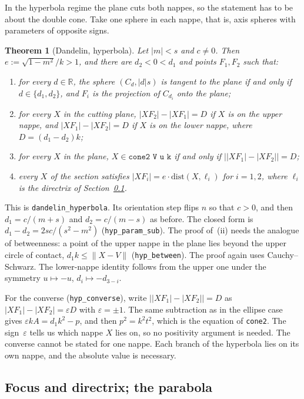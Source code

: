 \documentclass[11pt]{article}
\newtheorem{theorem}{Theorem}
\theoremstyle{remark}
\newcommand{\lean}[1]{\texttt{#1}}
\newcommand{\nm}[1]{\lVert #1\rVert}
\newcommand{\R}{\mathbb{R}}
\begin{document}
In the hyperbola regime the plane cuts both nappes, so the statement has to be about the double
cone. Take one sphere in each nappe, that is, axis spheres with parameters of opposite signs.

\begin{theorem}[Dandelin, hyperbola]\label{thm:hyperbola}
Let $|m|<s$ and $c\neq0$. Then $e:=\sqrt{1-m^2}/k>1$, and there are $d_2<0<d_1$ and points
$F_1,F_2$ such that:
\begin{enumerate}
\item[(i)] for every $d\in\R$, the sphere $(C_d,|d|s)$ is tangent to the plane if and only if $d\in\{d_1,d_2\}$, and
$F_i$ is the projection of $C_{d_i}$ onto the plane;
\item[(ii)] for every $X$ in the cutting plane, $|XF_2|-|XF_1|=D$ if $X$ is on the upper nappe, and
$|XF_1|-|XF_2|=D$ if $X$ is on the lower nappe, where $D=(d_1-d_2)k$;
\item[(iii)] for every $X$ in the plane, $X\in\lean{cone2 V u k}$ if and only if $\bigl||XF_1|-|XF_2|\bigr|=D$;
\item[(iv)] every $X$ of the section satisfies $|XF_i|=e\cdot\mathrm{dist}(X,\ell_i)$ for
$i=1,2$, where $\ell_i$ is the directrix of Section~\ref{sec:directrix}.
\end{enumerate}
\end{theorem}

This is \lean{dandelin\_hyperbola}. Its orientation step flips $n$ so that $c>0$, and then
$d_1=c/(m+s)$ and $d_2=c/(m-s)$ as before. The closed form is
$d_1-d_2=2sc/(s^2-m^2)$ (\lean{hyp\_param\_sub}). The proof of~(ii) needs the analogue of
betweenness: a point of the upper nappe in the plane lies beyond the upper circle of contact,
$d_1k\le\nm{X-V}$ (\lean{hyp\_between}). The proof again uses Cauchy--Schwarz. The lower-nappe identity follows from
the upper one under the symmetry $u\mapsto-u$, $d_i\mapsto-d_{3-i}$.

For the converse (\lean{hyp\_converse}), write $\bigl||XF_1|-|XF_2|\bigr|=D$ as
$|XF_1|-|XF_2|=\varepsilon D$ with $\varepsilon=\pm1$. The same subtraction as in the ellipse case
gives $\varepsilon kA=d_1k^2-p$, and then $p^2=k^2t^2$, which is the equation of \lean{cone2}. The
sign~$\varepsilon$ tells us which nappe $X$ lies on, so no positivity argument is needed. The
converse cannot be stated for one nappe. Each branch of the hyperbola lies on its own nappe, and the
absolute value is necessary.

\subsection{Focus and directrix; the parabola}\label{sec:directrix}
\end{document}
